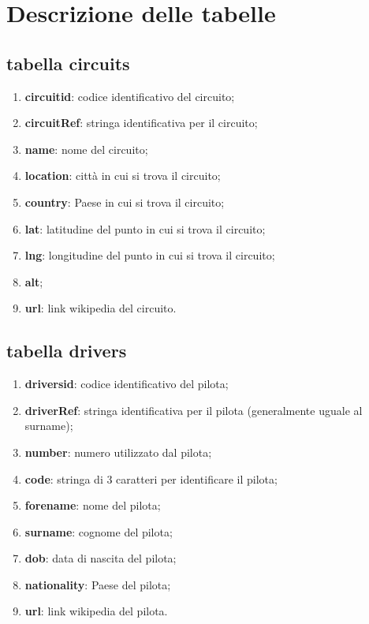 \section[Descrizione delle tabelle]{Descrizione delle tabelle}
\subsection{tabella circuits}%
\begin{enumerate}
    \item\textbf{ circuitid}: codice identificativo del circuito;
    \item \textbf{circuitRef}: stringa identificativa per il circuito;
    \item \textbf{name}: nome del circuito;
    \item \textbf{location}: città in cui si trova il circuito;
    \item \textbf{country}: Paese in cui si trova il circuito;
    \item \textbf{lat}: latitudine del punto in cui si trova il circuito;
    \item \textbf{lng}: longitudine del punto in cui si trova il circuito;
    \item \textbf{alt};
    \item \textbf{url}: link wikipedia del circuito.
\end{enumerate}
\subsection{tabella drivers}%
\begin{enumerate}
    \item \textbf{driversid}: codice identificativo del pilota;
    \item \textbf{driverRef}: stringa identificativa per il pilota (generalmente uguale al surname);
    \item \textbf{number}: numero utilizzato dal pilota;
    \item \textbf{code}: stringa di 3 caratteri per identificare il pilota;
    \item \textbf{forename}: nome del pilota;
    \item \textbf{surname}: cognome del pilota;
    \item \textbf{dob}: data di nascita del pilota;
    \item \textbf{nationality}: Paese del pilota;
    \item \textbf{url}: link wikipedia del pilota.
\end{enumerate}
